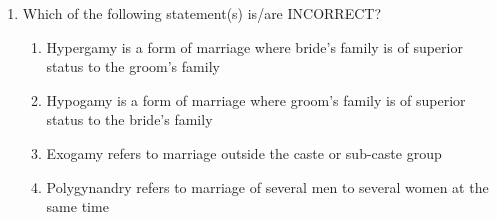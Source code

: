 \documentclass[12pt]{article}
\theoremstyle{remark}
\begin{document}
\begin{enumerate}
\item Which of the following statement(s) is/are INCORRECT?
\begin{enumerate}
    \item Hypergamy is a form of marriage where bride’s family is of superior status to the groom’s family
    \item Hypogamy is a form of marriage where groom’s family is of superior status to the bride’s family
    \item Exogamy refers to marriage outside the caste or sub-caste group
    \item Polygynandry refers to marriage of several men to several women at the same time
\end{enumerate}
\hfill{}

\end{enumerate}
\end{document}
